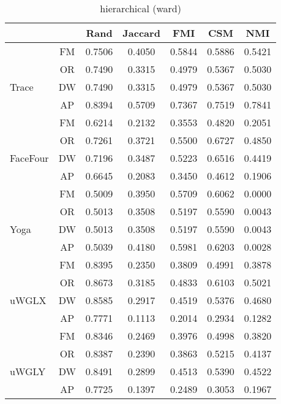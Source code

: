 \begin{table}
\caption{\label{hcucr}hierarchical (ward)}
\centering\\
\begin{tabular}{lcccccc}
\hline
& & {\sf Rand} & {\sf Jaccard} & {\sf FMI} & {\sf CSM} & {\sf NMI} \\
\hline 
& FM &  0.7506&  0.4050&  0.5844&  0.5886&  0.5421\\
& OR &  0.7490&  0.3315&  0.4979&  0.5367&  0.5030\\
Trace & DW &  0.7490&  0.3315&  0.4979&  0.5367&  0.5030\\
& AP & 0.8394 & 0.5709& 0.7367& 0.7519& 0.7841 \\
\hline
& FM &  0.6214&  0.2132&  0.3553&  0.4820&  0.2051\\
& OR &  0.7261&  0.3721&  0.5500&  0.6727&  0.4850\\
FaceFour & DW &  0.7196&  0.3487&  0.5223&  0.6516& 0.4419 \\
& AP &  0.6645& 0.2083& 0.3450& 0.4612& 0.1906  \\
\hline
& FM &  0.5009&  0.3950&  0.5709&  0.6062& 0.0000 \\
& OR &  0.5013&  0.3508&  0.5197&  0.5590& 0.0043 \\
Yoga & DW &  0.5013&  0.3508&  0.5197&  0.5590& 0.0043 \\
& AP &  0.5039& 0.4180& 0.5981& 0.6203& 0.0028  \\
\hline
& FM &  0.8395&  0.2350&  0.3809&  0.4991&  0.3878\\
& OR &  0.8673&  0.3185&  0.4833&  0.6103&  0.5021\\
uWGLX& DW &  0.8585&  0.2917&  0.4519&  0.5376& 0.4680 \\
& AP & 0.7771& 0.1113& 0.2014& 0.2934& 0.1282 \\
\hline
& FM &  0.8346&  0.2469&  0.3976&  0.4998&  0.3820\\
& OR &  0.8387&  0.2390&  0.3863&  0.5215&  0.4137 \\
uWGLY& DW &  0.8491&  0.2899&  0.4513&  0.5390&  0.4522\\
& AP & 0.7725& 0.1397& 0.2489& 0.3053& 0.1967  \\
\hline

\end{tabular}
\end{table}

